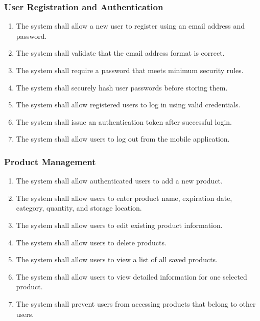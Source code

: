 \documentclass[12pt]{article}
\begin{document}
\subsubsection{User Registration and Authentication}
\begin{enumerate}[label=FR-\arabic*.]
    \item The system shall allow a new user to register using an email address and password.
    \item The system shall validate that the email address format is correct.
    \item The system shall require a password that meets minimum security rules.
    \item The system shall securely hash user passwords before storing them.
    \item The system shall allow registered users to log in using valid credentials.
    \item The system shall issue an authentication token after successful login.
    \item The system shall allow users to log out from the mobile application.
\end{enumerate}

\subsubsection{Product Management}
\begin{enumerate}[label=FR-\arabic*. ,resume]
    \item The system shall allow authenticated users to add a new product.
    \item The system shall allow users to enter product name, expiration date, category, quantity, and storage location.
    \item The system shall allow users to edit existing product information.
    \item The system shall allow users to delete products.
    \item The system shall allow users to view a list of all saved products.
    \item The system shall allow users to view detailed information for one selected product.
    \item The system shall prevent users from accessing products that belong to other users.
\end{enumerate}
\end{document}
